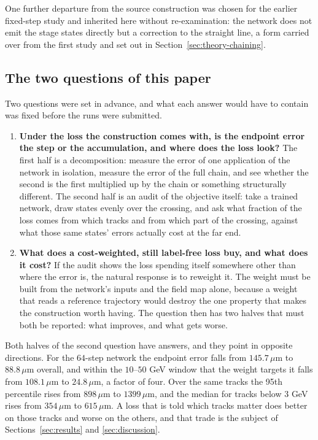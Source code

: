 \documentclass[11pt,a4paper]{article}
\newcommand{\um}{\ensuremath{\,\mu\mathrm{m}}}
\begin{document}
One further departure from the source construction was chosen for the earlier
fixed-step study and inherited here without re-examination: the network does not emit the stage states directly but a correction to
the straight line, a form carried over from the first study and set out in
Section~\ref{sec:theory-chaining}.

\subsection{The two questions of this paper}
\label{sec:intro-questions}

Two questions were set in advance, and what each answer would have to contain
was fixed before the runs were submitted.

\begin{enumerate}
  \item \textbf{Under the loss the construction comes with, is the endpoint
  error the step or the accumulation, and where does the loss look?} The first
  half is a decomposition: measure the error of one application of the network
  in isolation, measure the error of the full chain, and see whether the second
  is the first multiplied up by the chain or something structurally different.
  The second half is an audit of the objective itself: take a trained network,
  draw states evenly over the crossing, and ask what fraction of the loss comes
  from which tracks and from which part of the crossing, against what those
  same states' errors actually cost at the far end.
  \item \textbf{What does a cost-weighted, still label-free loss buy, and what
  does it cost?} If the audit shows the loss spending itself somewhere other
  than where the error is, the natural response is to reweight it. The weight
  must be built from the network's inputs and the field map alone, because a
  weight that reads a reference trajectory would destroy the one property that
  makes the construction worth having. The question then has two halves that
  must both be reported: what improves, and what gets worse.
\end{enumerate}

Both halves of the second question have answers, and they point in opposite
directions. For the $64$-step network the endpoint error falls from $145.7\um$
to $88.8\um$ overall, and within the $10$--$50$ GeV window that the weight
targets it falls from $108.1\um$ to $24.8\um$, a factor of four. Over the same
tracks the 95th percentile rises from $898\um$ to $1399\um$, and the median for
tracks below $3$ GeV rises from $354\um$ to $615\um$. A loss that is told which
tracks matter does better on those tracks and worse on the others, and that
trade is the subject of Sections~\ref{sec:results} and \ref{sec:discussion}.
\end{document}
